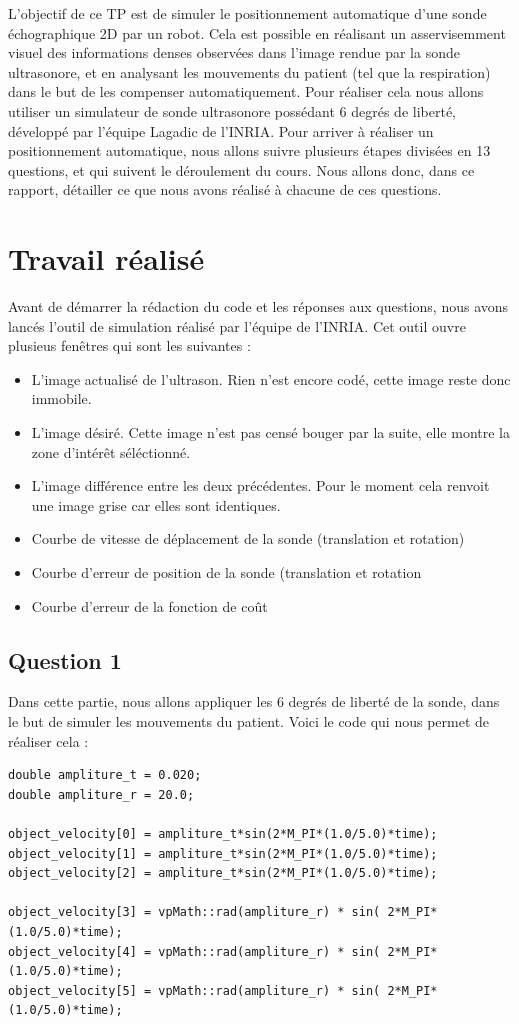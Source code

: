 \documentclass[a4paper,11pt]{article}
\begin{document}
L'objectif de ce TP est de simuler le positionnement automatique d'une sonde \'echographique 2D par un robot. Cela est possible en r\'ealisant un asservisemment visuel des informations denses observ\'ees dans l'image rendue par la sonde ultrasonore, et en analysant les mouvements du patient (tel que la respiration) dans le but de les compenser automatiquement.
Pour r\'ealiser cela nous allons utiliser un simulateur de sonde ultrasonore poss\'edant 6 degr\'es de libert\'e, développ\'e par l'\'equipe Lagadic de l'INRIA. Pour arriver \`a r\'ealiser un positionnement automatique, nous allons suivre plusieurs \'etapes divis\'ees en 13 questions, et qui suivent le d\'eroulement du cours. Nous allons donc, dans ce rapport, d\'etailler ce que nous avons réalis\'e \`a chacune de ces questions.


\section{Travail r\'ealis\'e}
Avant de d\'emarrer la r\'edaction du code et les r\'eponses aux questions, nous avons lanc\'es l'outil de simulation r\'ealis\'e par l'\'equipe de l'INRIA. Cet outil ouvre plusieus fen\^etres qui sont les suivantes :
\begin{itemize}
\item L'image actualis\'e de l'ultrason. Rien n'est encore cod\'e, cette image reste donc immobile.
\item L'image d\'esir\'e. Cette image n'est pas cens\'e bouger par la suite, elle montre la zone d'int\'er\^et s\'el\'ectionn\'e.
\item L'image diff\'erence entre les deux pr\'ec\'edentes. Pour le moment cela renvoit une image grise car elles sont identiques.
\item Courbe de vitesse de d\'eplacement de la sonde (translation et rotation)
\item Courbe d'erreur de position de la sonde (translation et rotation
\item Courbe d'erreur de la fonction de co\^ut
\end{itemize}

\subsection{Question 1}
Dans cette partie, nous allons appliquer les 6 degr\'es de libert\'e de la sonde, dans le but de simuler les mouvements du patient. Voici le code qui nous permet de r\'ealiser cela :
\begin{verbatim}
double ampliture_t = 0.020;
double ampliture_r = 20.0;

object_velocity[0] = ampliture_t*sin(2*M_PI*(1.0/5.0)*time);
object_velocity[1] = ampliture_t*sin(2*M_PI*(1.0/5.0)*time);
object_velocity[2] = ampliture_t*sin(2*M_PI*(1.0/5.0)*time);

object_velocity[3] = vpMath::rad(ampliture_r) * sin( 2*M_PI*(1.0/5.0)*time);
object_velocity[4] = vpMath::rad(ampliture_r) * sin( 2*M_PI*(1.0/5.0)*time);
object_velocity[5] = vpMath::rad(ampliture_r) * sin( 2*M_PI*(1.0/5.0)*time);
\end{verbatim}
\end{document}
